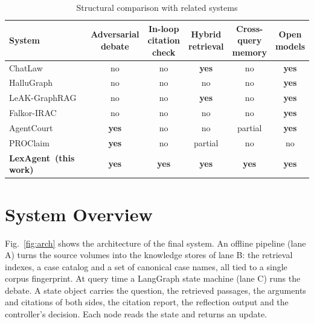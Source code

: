\documentclass[conference]{IEEEtran}
\newcommand{\sys}{LexAgent}
\newcommand{\yes}{\textcolor{cVerify}{\textbf{yes}}}
\newcommand{\no}{\textcolor{black!55}{no}}
\newcommand{\partialy}{\textcolor{cCtrl!70!black}{partial}}
\begin{document}
\begin{table}[t]
\caption{Structural comparison with related systems}\label{tab:related}
\centering
\footnotesize
\setlength{\tabcolsep}{2.6pt}
\begin{tabular}{@{}lccccc@{}}
\toprule
System & \shortstack{Adversarial\\debate} & \shortstack{In-loop\\citation\\check} & \shortstack{Hybrid\\retrieval} & \shortstack{Cross-\\query\\memory} & \shortstack{Open\\models} \\
\midrule
ChatLaw~\cite{chatlaw}            & \no  & \no & \yes      & \no       & \yes \\
HalluGraph~\cite{hallugraph}      & \no  & \no & \no       & \no       & \yes \\
LeAK-GraphRAG~\cite{leakgraphrag} & \no  & \no & \yes      & \no       & \yes \\
Falkor-IRAC~\cite{falkorirac}     & \no  & \no & \no       & \no       & \yes \\
AgentCourt~\cite{agentcourt}      & \yes & \no & \no       & \partialy & \yes \\
PROClaim~\cite{proclaim}          & \yes & \no & \partialy & \no       & \no  \\
\midrule
\textbf{\sys\ (this work)}        & \yes & \yes & \yes     & \yes      & \yes \\
\bottomrule
\end{tabular}
\end{table}

\section{System Overview}
Fig.~\ref{fig:arch} shows the architecture of the final system. An offline pipeline (lane A) turns the source volumes into the knowledge stores of lane B: the retrieval indexes, a case catalog and a set of canonical case names, all tied to a single corpus fingerprint. At query time a LangGraph state machine (lane C) runs the debate. A state object carries the question, the retrieved passages, the arguments and citations of both sides, the citation report, the reflection output and the controller's decision. Each node reads the state and returns an update.
\end{document}
